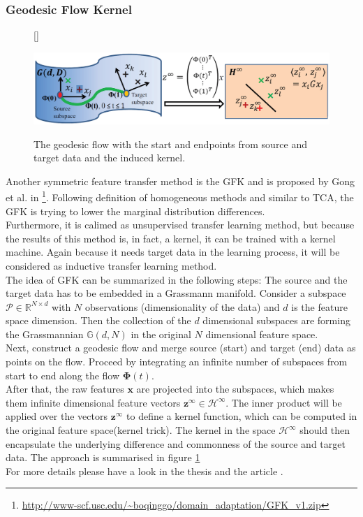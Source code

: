 \subsubsection{Geodesic Flow Kernel}
\begin{figure}[t]
	\centering
	[\FBwidth]
	{\caption[Summary of Geodesic Flow Kernel Approach]{The geodesic flow with the start and endpoints from source and target data and the induced kernel.\cite{Gong.}}}
	{\includegraphics[width=\linewidth]{figures/GFKApproach.png}\label{FigGFKApproach}}
\end{figure}
Another symmetric feature transfer method is the \ac{GFK} and is proposed by Gong et al. in \cite{Gong.}\footnote{\url{http://www-scf.usc.edu/~boqinggo/domain\_adaptation/GFK\_v1.zip}}.
Following definition of homogeneous methods and similar to \acs{TCA}, the \acl{GFK} is trying to lower the marginal distribution differences.\cite[p. 13]{Weiss.2016}\\
Furthermore, it is calimed as unsupervised transfer learning method, but because the results of this method is, in fact, a kernel, it can be trained with a kernel machine.\cite{Gong.}
Again because it needs target data in the learning process, it will be considered as inductive transfer learning method.\\
The idea of \acs{GFK} can be summarized in the following steps:
The source and the target data has to be embedded in a Grassmann manifold.
Consider a subspace $\mathcal{P} \in \mathbb{R}^{N \times d}$ with $N$ observations (dimensionality of the data) and $d$ is the feature space dimension.
Then the collection of the $d$ dimensional subspaces are forming the Grassmannian $\mathbb{G}(d, N)$ in the original $N$ dimensional feature space.\cite{Gong.}\\
Next, construct a geodesic flow and merge source (start) and target (end) data as points on the flow.
Proceed by integrating an infinite number of subspaces from start to end along the flow $\boldsymbol{\Phi}(t)$.\cite{Gong.}\\
After that, the raw features $\mathbf{x}$ are projected into the subspaces, which makes them infinite dimensional feature vectors $\mathbf{z}^\infty \in \mathcal{H}^\infty$.
The inner product will be applied over the vectors $\mathbf{z}^\infty$ to define a kernel function, which can be computed in the original feature space(kernel trick).
The kernel in the space $\mathcal{H}^\infty$ should then encapsulate the underlying difference and commonness of the source and target data.\cite{Gong.} The approach is summarised in figure \ref{FigGFKApproach}\\
For more details please have a look in the thesis \cite[p. 45;110-113]{Gong.2015} and the article \cite{Gong.}.
